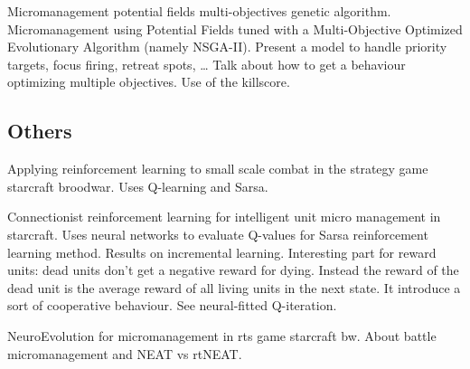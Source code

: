 Micromanagement potential fields multi-objectives genetic algorithm. Micromanagement using Potential Fields tuned with a Multi-Objective Optimized Evolutionary Algorithm (namely NSGA-II). Present a model to handle priority targets, focus firing, retreat spots, … Talk about how to get a behaviour optimizing multiple objectives. Use of the killscore.

\citet{SiSuBa14}

\subsection{Others}\label{subsec:others}

Applying reinforcement learning to small scale combat in the strategy game starcraft broodwar. Uses Q-learning and Sarsa.

Connectionist reinforcement learning for intelligent unit micro management in starcraft.
Uses neural networks to evaluate Q-values for Sarsa reinforcement learning method. Results on incremental learning.
Interesting part for reward units: dead units don’t get a negative reward for dying.
Instead the reward of the dead unit is the average reward of all living units in the next state.
It introduce a sort of cooperative behaviour. See neural-fitted Q-iteration.

NeuroEvolution for micromanagement in rts game starcraft bw. About battle micromanagement and NEAT vs rtNEAT.


